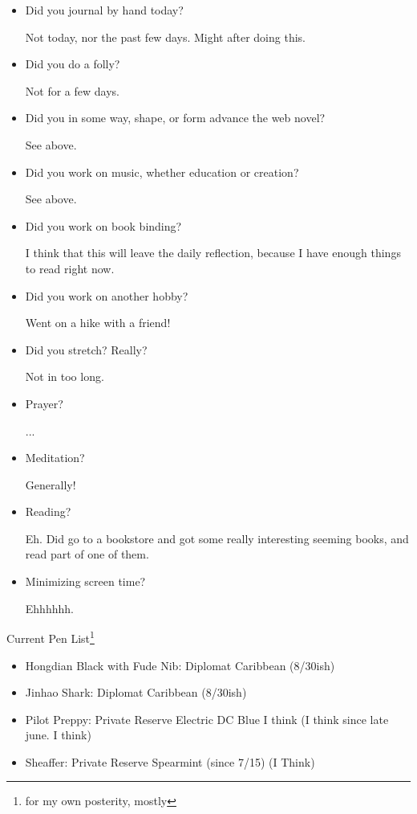\documentclass[12pt]{article}
\renewcommand{\,}{\textsuperscript{,}}
\begin{document}
\begin{itemize}

\item Did you journal by hand today?

Not today, nor the past few days. Might after doing this.

\item Did you do a folly?

Not for a few days.

\item Did you in some way, shape, or form advance the web novel?

See above.

\item Did you work on music, whether education or creation?

See above.

\item Did you work on book binding?

I think that this will leave the daily reflection, because I have enough things to read right now.

\item Did you work on another hobby?

Went on a hike with a friend!

\item Did you stretch? Really?

Not in too long.

\item Prayer?

...

\item Meditation?

Generally!

\item Reading?

Eh.
Did go to a bookstore and got some really interesting seeming books, and read part of one of them.

\item Minimizing screen time?

Ehhhhhh.

\end{itemize}

Current Pen List\footnote{for my own posterity, mostly}

\begin{itemize}  
\item Hongdian Black with Fude Nib: Diplomat Caribbean (8/30ish)  
\item Jinhao Shark: Diplomat Caribbean (8/30ish)  
\item Pilot Preppy: Private Reserve Electric DC Blue I think (I think since late june. I think)  
\item Sheaffer: Private Reserve Spearmint (since 7/15) (I Think)
\end{itemize}
\end{document}
